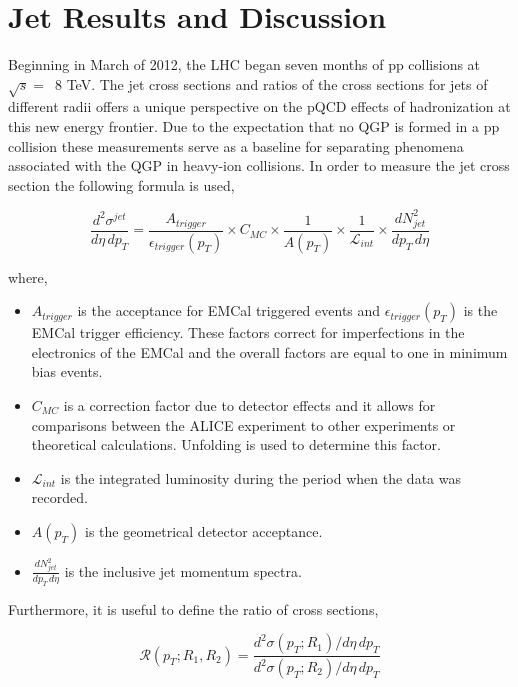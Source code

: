 \chapter{Jet Results and Discussion} \label{ch:analysis}

Beginning in March of 2012, the LHC began seven months of pp collisions at $\sqrt{s} = \,$ 8 TeV.  The jet cross sections and ratios of the cross sections for jets of different radii offers a unique perspective on the pQCD effects of hadronization at this new energy frontier.  Due to the expectation that no QGP is formed in a pp collision these measurements serve as a baseline for separating phenomena associated with the QGP in heavy-ion collisions.  In order to measure the jet cross section the following formula is used,

\begin{equation}
	\frac{d^{2} \sigma^{jet}}{d\eta \, dp_{T}} = \frac{A_{trigger}}{\epsilon_{trigger}(p_{T})} \times C_{MC} \times \frac{1}{A(p_{T}) } \times \frac{1}{\mathscr{L}_{int}} \times \frac{dN^{2}_{jet}}{dp_{T} \, d\eta}
\label{eq:xsecdef}
\end{equation}

\noindent
where,

\begin{itemize}
  \item $A_{trigger}$ is the acceptance for EMCal triggered events and $\epsilon_{trigger}(p_{T})$ is the EMCal trigger efficiency.  These factors correct for imperfections in the electronics of the EMCal and the overall factors are equal to one in minimum bias events.
  \item $C_{MC}$ is a correction factor due to detector effects and it allows for comparisons between the ALICE experiment to other experiments or theoretical calculations.  Unfolding is used to determine this factor.
  \item $\mathscr{L}_{int}$ is the integrated luminosity during the period when the data was recorded.
  \item $A(p_{T})$ is the geometrical detector acceptance.
  \item $\frac{dN^{2}_{jet}}{dp_{T} \, d\eta}$ is the inclusive jet momentum spectra.
  
\end{itemize}

\noindent
Furthermore, it is useful to define the ratio of cross sections,

\begin{equation}
\mathscr{R}(p_{T};R_{1},R_{2}) = \frac{d^{2}\sigma(p_{T};R_{1})/d\eta \, dp_{T}}{d^{2}\sigma(p_{T};R_{2})/d\eta \, dp_{T}}
\label{eq:xsecratio}
\end{equation}

